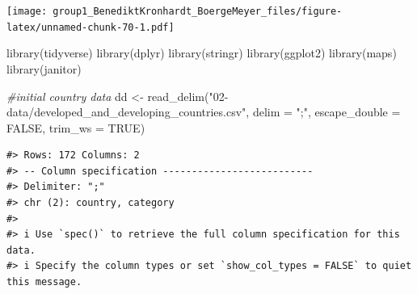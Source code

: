 \documentclass[
  11pt,
  a4paper,
  twoside]{scrbook}
\newenvironment{Shaded}{\begin{snugshade}}{\end{snugshade}}
\newcommand{\AttributeTok}[1]{\textcolor[rgb]{0.77,0.63,0.00}{#1}}
\newcommand{\CommentTok}[1]{\textcolor[rgb]{0.56,0.35,0.01}{\textit{#1}}}
\newcommand{\ConstantTok}[1]{\textcolor[rgb]{0.00,0.00,0.00}{#1}}
\newcommand{\FunctionTok}[1]{\textcolor[rgb]{0.00,0.00,0.00}{#1}}
\newcommand{\NormalTok}[1]{#1}
\newcommand{\OtherTok}[1]{\textcolor[rgb]{0.56,0.35,0.01}{#1}}
\newcommand{\StringTok}[1]{\textcolor[rgb]{0.31,0.60,0.02}{#1}}
\begin{document}
\linespread{1}\texttt{[image: group1\_BenediktKronhardt\_BoergeMeyer\_files/figure-latex/unnamed-chunk-70-1.pdf]}

\linespread{1}

\begin{Shaded}
\begin{Highlighting}[]
\FunctionTok{library}\NormalTok{(tidyverse)}
\FunctionTok{library}\NormalTok{(dplyr)}
\FunctionTok{library}\NormalTok{(stringr)}
\FunctionTok{library}\NormalTok{(ggplot2)}
\FunctionTok{library}\NormalTok{(maps)}
\FunctionTok{library}\NormalTok{(janitor)}

\CommentTok{\#initial country data}
\NormalTok{dd }\OtherTok{\textless{}{-}} \FunctionTok{read\_delim}\NormalTok{(}\StringTok{"02{-}data/developed\_and\_developing\_countries.csv"}\NormalTok{, }
                                  \AttributeTok{delim =} \StringTok{";"}\NormalTok{, }\AttributeTok{escape\_double =} \ConstantTok{FALSE}\NormalTok{,}
                                  \AttributeTok{trim\_ws =} \ConstantTok{TRUE}\NormalTok{)}
\end{Highlighting}
\end{Shaded}

\linespread{1}

\begin{verbatim}
#> Rows: 172 Columns: 2
#> -- Column specification --------------------------
#> Delimiter: ";"
#> chr (2): country, category
#> 
#> i Use `spec()` to retrieve the full column specification for this data.
#> i Specify the column types or set `show_col_types = FALSE` to quiet this message.
\end{verbatim}

\linespread{1}
\end{document}
